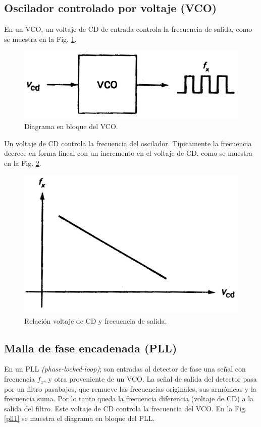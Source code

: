 \documentclass[10pt,a4paper]{IEEEtran}
\begin{document}
    \subsection{Oscilador controlado por voltaje (VCO)}
    En un VCO, un voltaje de CD de entrada controla la frecuencia de salida, como se muestra en la Fig. \ref{vco1}.
    
    \begin{figure}[H]
        \centering
        \includegraphics[scale=0.3]{vco1.png}
        \caption{Diagrama en bloque del VCO.}
        \label{vco1}
    \end{figure}
    
    Un voltaje de CD controla la frecuencia del oscilador. Típicamente la frecuencia decrece en forma lineal con un incremento en el voltaje de CD, como se muestra en la Fig. \ref{vco2}.
    
    \begin{figure}[H]
        \centering
        \includegraphics[scale=0.3]{vco2.png}
        \caption{Relación voltaje de CD y frecuencia de salida.}
        \label{vco2}
    \end{figure}
    
    \subsection{Malla de fase encadenada (PLL)}
    En un PLL \emph{(phase-locked-loop)}; son entradas al detector de fase una señal con frecuencia $f_x$, y otra proveniente de un VCO. La señal de salida del detector pasa por un filtro pasabajos, que remueve las frecuencias originales, sus armónicas y la frecuencia suma. Por lo tanto queda la frecuencia diferencia (voltaje de CD) a la salida del filtro. Este voltaje de CD controla la frecuencia del VCO. En la Fig. \ref{pll1} se muestra el diagrama en bloque del PLL.
    
\end{document}
